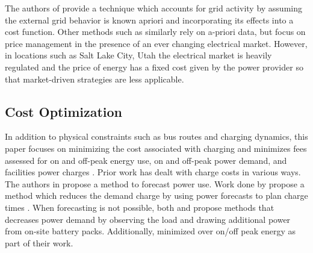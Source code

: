 \par The authors of \cite{jahic_preemptive_2019} provide a technique which accounts for grid activity by assuming the external grid behavior is known apriori and incorporating its effects into a cost function. Other methods such as \cite{Corinaldesi_2020} similarly rely on a-priori data, but focus on price management in the presence of an ever changing electrical market.  However, in locations such as Salt Lake City, Utah the electrical market is heavily regulated and the price of energy has a fixed cost given by the power provider so that market-driven strategies are less applicable.
\subsection{Cost Optimization}
In addition to physical constraints such as bus routes and charging dynamics, this paper focuses on minimizing the cost associated with charging and minimizes fees assessed for on and off-peak energy use, on and off-peak power demand, and facilities power charges \cite{rocky_mountain_power_rocky_2021}. Prior work has dealt with charge costs in various ways.  
The authors in \cite{gao_charging_2019} propose a method to forecast power use. Work done by \cite{qin_numerical_2016} propose a method which reduces the demand charge by using power forecasts to plan charge times \cite{gao_charging_2019}.  When forecasting is not possible, both \cite{ojer_development_2020} and \cite{cheng_smart_2020} propose methods that decreases power demand by observing the load and drawing additional power from on-site battery packs. Additionally, \cite{el-taweel_incorporation_2019} minimized over on/off peak energy as part of their work.
